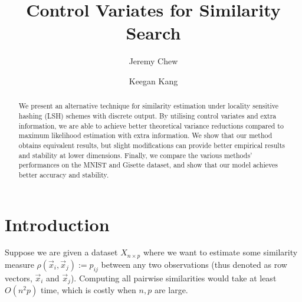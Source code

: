\documentclass[runningheads]{llncs}
\begin{document}
%
\title{Control Variates for Similarity Search}
%
%
\author{Jeremy Chew \and Keegan Kang}
%
%

%
\maketitle              %
%
\begin{abstract}
    We present an alternative technique for similarity estimation under locality sensitive hashing (LSH) schemes with discrete output. By utilising control variates and extra information, we are able to achieve better theoretical variance reductions compared to maximum likelihood estimation with extra information. We show that our method obtains equivalent results, but slight modifications can provide better empirical results and stability at lower dimensions. Finally, we compare the various methods' performances on the MNIST and Gisette dataset, and show that our model achieves better accuracy and stability.

\end{abstract}


\section{Introduction}
    Suppose we are given a dataset $X_{n \times p}$ where we want to estimate some similarity measure $\rho(\vec{x}_i, \vec{x}_j) := p_{ij}$ between any two observations (thus denoted as row vectors, $\vec{x}_i$ and $\vec{x}_j$). Computing all pairwise similarities would take at least $O(n^2p)$ time, which is costly when $n, p$ are large.
    
\end{document}
